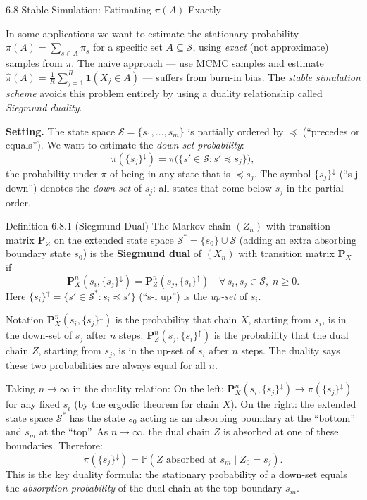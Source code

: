 \documentclass[aspectratio=169,10pt]{beamer}
\newcommand{\PP}{\mathbb{P}}
\newcommand{\bfP}{\mathbf{P}}
\begin{document}
\begin{frame}[allowframebreaks]{6.8 Stable Simulation: Estimating $\pi(A)$ Exactly}

In some applications we want to estimate the stationary probability $\pi(A) = \sum_{s \in A} \pi_s$ for a specific set $A \subseteq \mathcal{S}$, using \emph{exact} (not approximate) samples from $\pi$.
The naive approach --- use MCMC samples and estimate $\hat\pi(A) = \frac{1}{R}\sum_{j=1}^R \mathbf{1}(X_j \in A)$ --- suffers from burn-in bias.
The \emph{stable simulation scheme} avoids this problem entirely by using a duality relationship called \emph{Siegmund duality}.

\textbf{Setting.}
The state space $\mathcal{S} = \{s_1, \ldots, s_m\}$ is partially ordered by $\preceq$ (``precedes or equals'').
We want to estimate the \emph{down-set probability}:
\[
  \pi(\{s_j\}^\downarrow) = \pi\bigl(\{s' \in \mathcal{S} : s' \preceq s_j\}\bigr),
\]
the probability under $\pi$ of being in any state that is $\preceq s_j$.
The symbol $\{s_j\}^\downarrow$ (``s-j down'') denotes the \emph{down-set} of $s_j$: all states that come below $s_j$ in the partial order.

\begin{block}{Definition 6.8.1 (Siegmund Dual)}
The Markov chain $(Z_n)$ with transition matrix $\bfP_Z$ on the extended state space $\mathcal{S}^* = \{s_0\} \cup \mathcal{S}$ (adding an extra absorbing boundary state $s_0$) is the \textbf{Siegmund dual} of $(X_n)$ with transition matrix $\bfP_X$ if
\[
  \bfP_X^n(s_i, \{s_j\}^\downarrow) = \bfP_Z^n(s_j, \{s_i\}^\uparrow) \quad \forall\, s_i, s_j \in \mathcal{S},\; n \ge 0.
\]
Here $\{s_i\}^\uparrow = \{s' \in \mathcal{S}^* : s_i \preceq s'\}$ (``s-i up'') is the \emph{up-set} of $s_i$.
\end{block}

\begin{block}{Notation}
$\bfP_X^n(s_i, \{s_j\}^\downarrow)$ is the probability that chain $X$, starting from $s_i$, is in the down-set of $s_j$ after $n$ steps.
$\bfP_Z^n(s_j, \{s_i\}^\uparrow)$ is the probability that the dual chain $Z$, starting from $s_j$, is in the up-set of $s_i$ after $n$ steps.
The duality says these two probabilities are always equal for all $n$.
\end{block}

\framebreak

Taking $n \to \infty$ in the duality relation:
On the left: $\bfP_X^n(s_i, \{s_j\}^\downarrow) \to \pi(\{s_j\}^\downarrow)$ for any fixed $s_i$ (by the ergodic theorem for chain $X$).
On the right: the extended state space $\mathcal{S}^*$ has the state $s_0$ acting as an absorbing boundary at the ``bottom'' and $s_m$ at the ``top''.
As $n \to \infty$, the dual chain $Z$ is absorbed at one of these boundaries.
Therefore:
\[
  \pi(\{s_j\}^\downarrow) = \PP(Z \text{ absorbed at } s_m \mid Z_0 = s_j).
\]
This is the key duality formula: the stationary probability of a down-set equals the \emph{absorption probability} of the dual chain at the top boundary $s_m$.


\end{frame}
\end{document}
